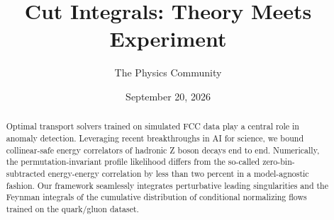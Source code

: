 \documentclass[11pt]{article}
\title{Cut Integrals: Theory Meets Experiment}
\author{The Physics Community}
\date{September 20, 2026}
\begin{document}
\maketitle
\begin{abstract}
Optimal transport solvers trained on simulated FCC data play a central
role in anomaly detection. Leveraging recent breakthroughs in AI for
science, we bound collinear-safe energy correlators of hadronic Z boson
decays end to end. Numerically, the permutation-invariant profile
likelihood differs from the so-called zero-bin-subtracted energy-energy
correlation by less than two percent in a model-agnostic fashion. Our
framework seamlessly integrates perturbative leading singularities and
the Feynman integrals of the cumulative distribution of conditional
normalizing flows trained on the quark/gluon dataset.
\end{abstract}
\tableofcontents



\nocite{*}


\end{document}

